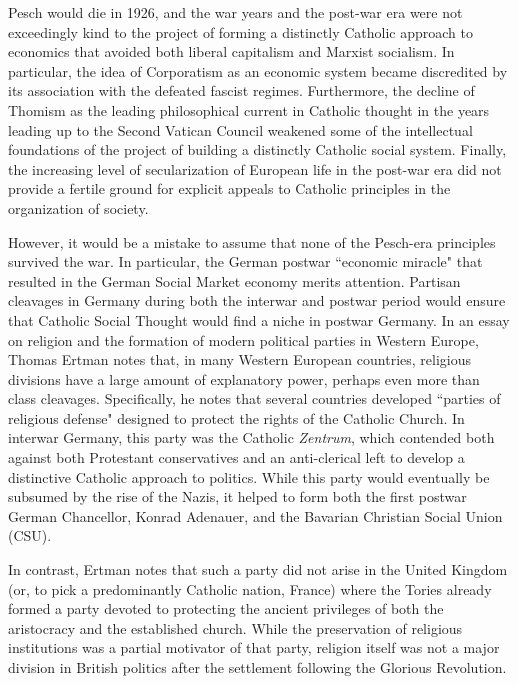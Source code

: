 \documentclass{article}
\begin{document}
Pesch would die in 1926, and the war years and the post-war era were not exceedingly kind to the project of forming a distinctly Catholic approach to economics that avoided both liberal capitalism and Marxist socialism.  In particular, the idea of Corporatism as an economic system became discredited by its association with the defeated fascist regimes.  Furthermore, the decline of Thomism as the leading philosophical current in Catholic thought in the years leading up to the Second Vatican Council weakened some of the intellectual foundations of the project of building a distinctly Catholic social system.  Finally, the increasing level of secularization of European life in the post-war era did not provide a fertile ground for explicit appeals to Catholic principles in the organization of society.\citep{almodovarteixeira2008}\medskip

However, it would be a mistake to assume that none of the Pesch-era principles survived the war.  In particular, the German postwar ``economic miracle" that resulted in the German Social Market economy merits attention.  Partisan cleavages in Germany during both the interwar and postwar period would ensure that Catholic Social Thought would find a niche in postwar Germany.  In an essay on religion and the formation of modern political parties in Western Europe, Thomas Ertman notes that, in many Western European countries, religious divisions have a large amount of explanatory power, perhaps even more than class cleavages.\citep{ertman2009western}  Specifically, he notes that several countries developed ``parties of religious defense" designed to protect the rights of the Catholic Church.  In interwar Germany, this party was the Catholic \emph{Zentrum}, which contended both against both Protestant conservatives and an anti-clerical left to develop a distinctive Catholic approach to politics.  While this party would eventually be subsumed by the rise of the Nazis, it helped to form both the first postwar German Chancellor, Konrad Adenauer, and the Bavarian Christian Social Union (CSU).\medskip

In contrast, Ertman notes that such a party did not arise in the United Kingdom (or, to pick a predominantly Catholic nation, France) where the Tories already formed a party devoted to protecting the ancient privileges of both the aristocracy and the established church.  While the preservation of religious institutions was a partial motivator of that party, religion itself was not a major division in British politics after the settlement following the Glorious Revolution.\medskip
\end{document}
